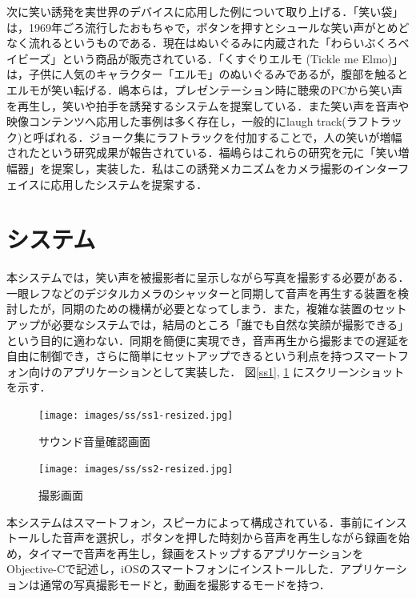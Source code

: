 \documentclass[report,10pt,uplatex,titlepage]{jsarticle}
\begin{document}
次に笑い誘発を実世界のデバイスに応用した例について取り上げる．「笑い袋」は，1969年ごろ流行したおもちゃで，ボタンを押すとシュールな笑い声がとめどなく流れるというものである．現在はぬいぐるみに内蔵された「わらいぶくろベイビーズ」という商品が販売されている\cite{waraibukurobabies}．「くすぐりエルモ (Tickle me Elmo)」\cite{ticklemeelmo}は，子供に人気のキャラクター「エルモ」のぬいぐるみであるが，腹部を触るとエルモが笑い転げる．嶋本らは，プレゼンテーション時に聴衆のPCから笑い声を再生し，笑いや拍手を誘発するシステムを提案している\cite{shimamoto2013}．また笑い声を音声や映像コンテンツへ応用した事例は多く存在し，一般的にlaugh track(ラフトラック)と呼ばれる．ジョーク集にラフトラックを付加することで，人の笑いが増幅されたという研究成果が報告されている\cite{chapman1973funniness}．福嶋らはこれらの研究を元に「笑い増幅器」を提案し，実装した\cite{fukushima2010}．私はこの誘発メカニズムをカメラ撮影のインターフェイスに応用したシステムを提案する．

\section{システム}

本システムでは，笑い声を被撮影者に呈示しながら写真を撮影する必要がある．一眼レフなどのデジタルカメラのシャッターと同期して音声を再生する装置を検討したが，同期のための機構が必要となってしまう．また，複雑な装置のセットアップが必要なシステムでは，結局のところ「誰でも自然な笑顔が撮影できる」という目的に適わない．同期を簡便に実現でき，音声再生から撮影までの遅延を自由に制御でき，さらに簡単にセットアップできるという利点を持つスマートフォン向けのアプリケーションとして実装した．
図\ref{ss1}, \ref{ss2} にスクリーンショットを示す．

\begin{figure}[h] 
\begin{minipage}{0.49\columnwidth}
\begin{center}
\texttt{[image: images/ss/ss1-resized.jpg]}
\caption{サウンド音量確認画面}
\label{ss1}
\end{center}
\end{minipage}
\begin{minipage}{0.49\columnwidth}
\begin{center}
\texttt{[image: images/ss/ss2-resized.jpg]}
\caption{撮影画面}
\label{ss2}
\end{center}
\end{minipage}
\end{figure}


本システムはスマートフォン，スピーカによって構成されている．事前にインストールした音声を選択し，ボタンを押した時刻から音声を再生しながら録画を始め，タイマーで音声を再生し，録画をストップするアプリケーションをObjective-Cで記述し，iOSのスマートフォンにインストールした．アプリケーションは通常の写真撮影モードと，動画を撮影するモードを持つ．
\end{document}
